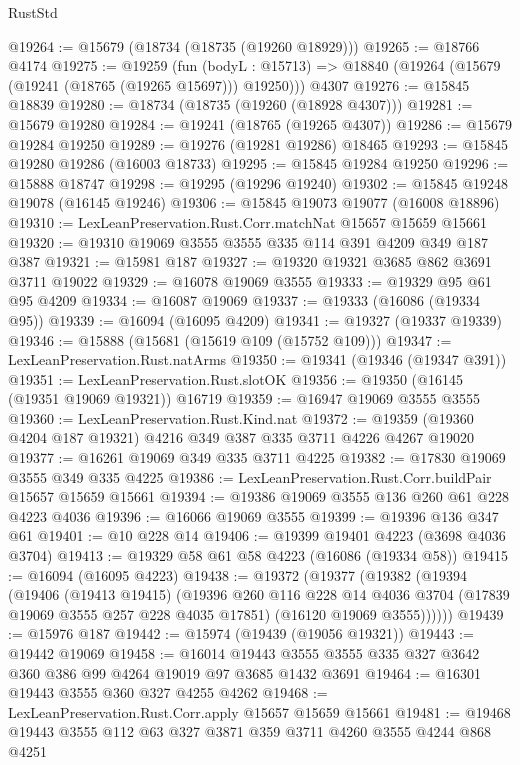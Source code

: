 \begin{lexlean}{RustStd}
\begin{coremodule}
@19264 := @15679 (@18734 (@18735 (@19260 @18929)))
@19265 := @18766 @4174
@19275 := @19259
    (fun (bodyL : @15713) => @18840 (@19264 (@15679 (@19241 (@18765 (@19265 @15697))) @19250)))
    @4307
@19276 := @15845 @18839
@19280 := @18734 (@18735 (@19260 (@18928 @4307)))
@19281 := @15679 @19280
@19284 := @19241 (@18765 (@19265 @4307))
@19286 := @15679 @19284 @19250
@19289 := @19276 (@19281 @19286) @18465
@19293 := @15845 @19280 @19286 (@16003 @18733)
@19295 := @15845 @19284 @19250
@19296 := @15888 @18747
@19298 := @19295 (@19296 @19240)
@19302 := @15845 @19248 @19078 (@16145 @19246)
@19306 := @15845 @19073 @19077 (@16008 @18896)
@19310 := LexLeanPreservation.Rust.Corr.matchNat @15657 @15659 @15661
@19320 := @19310 @19069 @3555 @3555 @335 @114 @391 @4209 @349 @187 @387
@19321 := @15981 @187
@19327 := @19320 @19321 @3685 @862 @3691 @3711 @19022
@19329 := @16078 @19069 @3555
@19333 := @19329 @95 @61 @95 @4209
@19334 := @16087 @19069
@19337 := @19333 (@16086 (@19334 @95))
@19339 := @16094 (@16095 @4209)
@19341 := @19327 (@19337 @19339)
@19346 := @15888 (@15681 (@15619 @109 (@15752 @109)))
@19347 := LexLeanPreservation.Rust.natArms
@19350 := @19341 (@19346 (@19347 @391))
@19351 := LexLeanPreservation.Rust.slotOK
@19356 := @19350 (@16145 (@19351 @19069 @19321)) @16719
@19359 := @16947 @19069 @3555 @3555
@19360 := LexLeanPreservation.Rust.Kind.nat
@19372 := @19359 (@19360 @4204 @187 @19321) @4216 @349 @387 @335 @3711 @4226 @4267 @19020
@19377 := @16261 @19069 @349 @335 @3711 @4225
@19382 := @17830 @19069 @3555 @349 @335 @4225
@19386 := LexLeanPreservation.Rust.Corr.buildPair @15657 @15659 @15661
@19394 := @19386 @19069 @3555 @136 @260 @61 @228 @4223 @4036
@19396 := @16066 @19069 @3555
@19399 := @19396 @136 @347 @61
@19401 := @10 @228 @14
@19406 := @19399 @19401 @4223 (@3698 @4036 @3704)
@19413 := @19329 @58 @61 @58 @4223 (@16086 (@19334 @58))
@19415 := @16094 (@16095 @4223)
@19438 := @19372
    (@19377
      (@19382
        (@19394
          (@19406
            (@19413 @19415)
            (@19396
              @260
              @116
              @228
              @14
              @4036
              @3704
              (@17839 @19069 @3555 @257 @228 @4035 @17851)
              (@16120 @19069 @3555))))))
@19439 := @15976 @187
@19442 := @15974 (@19439 (@19056 @19321))
@19443 := @19442 @19069
@19458 := @16014 @19443 @3555 @3555 @335 @327 @3642 @360 @386 @99 @4264 @19019 @97 @3685 @1432 @3691
@19464 := @16301 @19443 @3555 @360 @327 @4255 @4262
@19468 := LexLeanPreservation.Rust.Corr.apply @15657 @15659 @15661
@19481 := @19468 @19443 @3555 @112 @63 @327 @3871 @359 @3711 @4260 @3555 @4244 @868 @4251

\end{coremodule}
\end{lexlean}
